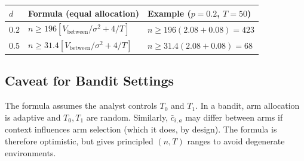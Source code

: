 \documentclass{article}
\begin{document}
\begin{center}
\begin{tabular}{lll}
\hline
$d$ & Formula (equal allocation) & Example ($p=0.2$, $T=50$) \\
\hline
$0.2$ & $n \geq 196\!\left[V_{\mathrm{between}}/\sigma^2 + 4/T\right]$ & $n \geq 196(2.08 + 0.08) = 423$ \\
$0.5$ & $n \geq 31.4\!\left[V_{\mathrm{between}}/\sigma^2 + 4/T\right]$ & $n \geq 31.4(2.08 + 0.08) = 68$ \\
\hline
\end{tabular}
\end{center}

\subsection{Caveat for Bandit Settings}

The formula assumes the analyst controls $T_0$ and $T_1$. In a bandit, arm allocation is adaptive
and $T_0, T_1$ are random. Similarly, $\bar{c}_{i,a}$ may differ between arms if context
influences arm selection (which it does, by design). The formula is therefore optimistic, but
gives principled $(n, T)$ ranges to avoid degenerate environments.
\end{document}
